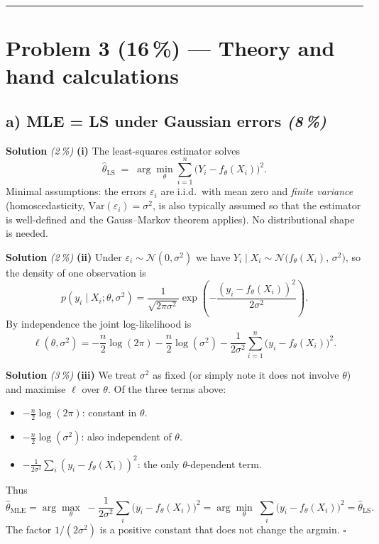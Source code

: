 \documentclass[11pt,a4paper]{article}
\newcommand{\points}[1]{\textbf{(#1\,\%)}}
\newcommand{\subpoints}[1]{\textit{(#1\,\%)}}
\newcommand{\sol}{\noindent\textbf{Solution}}
\begin{document}
\vspace{0.6em}
\hrule
\vspace{1em}

\section*{Problem 3 \points{16} --- Theory and hand calculations}

\subsection*{a) MLE = LS under Gaussian errors \subpoints{8}}

\sol{} \subpoints{2} \textbf{(i)} The least-squares estimator solves
$$\hat\theta_{\mathrm{LS}} \;=\; \arg\min_{\theta} \sum_{i=1}^n \bigl(Y_i - f_\theta(X_i)\bigr)^2.$$
Minimal assumptions: the errors $\varepsilon_i$ are i.i.d.\ with mean zero and \emph{finite variance}
(homoscedasticity, $\mathrm{Var}(\varepsilon_i)=\sigma^2$, is also typically assumed so that the
estimator is well-defined and the Gauss--Markov theorem applies). No distributional shape is needed.

\medskip
\sol{} \subpoints{2} \textbf{(ii)} Under $\varepsilon_i \sim \mathcal{N}(0,\sigma^2)$ we have
$Y_i \mid X_i \sim \mathcal{N}\!\bigl(f_\theta(X_i),\,\sigma^2\bigr)$, so the density of one observation is
$$p(y_i\mid X_i;\theta,\sigma^2)=\frac{1}{\sqrt{2\pi\sigma^2}}
   \exp\!\left(-\frac{(y_i-f_\theta(X_i))^2}{2\sigma^2}\right).$$
By independence the joint log-likelihood is
$$\ell(\theta,\sigma^2)
   = -\frac{n}{2}\log(2\pi) - \frac{n}{2}\log(\sigma^2)
     - \frac{1}{2\sigma^2}\sum_{i=1}^n\bigl(y_i - f_\theta(X_i)\bigr)^2.$$

\medskip
\sol{} \subpoints{3} \textbf{(iii)} We treat $\sigma^2$ as fixed (or simply note it does not
involve $\theta$) and maximise $\ell$ over $\theta$. Of the three terms above:
\begin{itemize}
  \item $-\tfrac{n}{2}\log(2\pi)$: constant in $\theta$.
  \item $-\tfrac{n}{2}\log(\sigma^2)$: also independent of $\theta$.
  \item $-\tfrac{1}{2\sigma^2}\sum_i(y_i-f_\theta(X_i))^2$: the only $\theta$-dependent term.
\end{itemize}
Thus
$$\hat\theta_{\mathrm{MLE}}
   = \arg\max_\theta\;-\frac{1}{2\sigma^2}\sum_i\bigl(y_i-f_\theta(X_i)\bigr)^2
   = \arg\min_\theta\;\sum_i\bigl(y_i-f_\theta(X_i)\bigr)^2
   = \hat\theta_{\mathrm{LS}}.$$
The factor $1/(2\sigma^2)$ is a positive constant that does not change the argmin. $\square$
\end{document}

